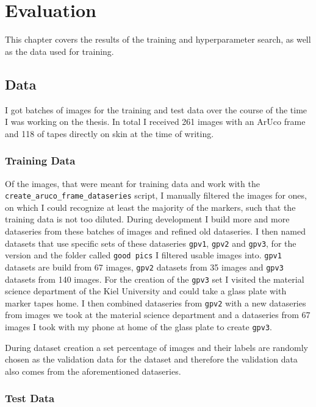 \documentclass[10pt]{book}
\begin{document}
\chapter{Evaluation}
\label{chap:eval}

This chapter covers the results of the training and hyperparameter search, as well as the data used for training.

\section{Data}

I got batches of images for the training and test data over the course of the time I was working on the thesis. In total I received 261 images with an \ac{ArUco} frame and 118 of tapes directly on skin at the time of writing. 

\subsection{Training Data}

Of the images, that were meant for training data and work with the \texttt{create\_aruco\_frame\_dataseries} script, I manually filtered the images for ones, on which I could recognize at least the majority of the markers, such that the training data is not too diluted. During development I build more and more dataseries from these batches of images and refined old dataseries. I then named datasets that use specific sets of these dataseries \texttt{gpv1}, \texttt{gpv2} and \texttt{gpv3}, for the version and the folder called \texttt{good pics} I filtered usable images into. \texttt{gpv1} datasets are build from 67 images, \texttt{gpv2} datasets from 35 images and \texttt{gpv3} datasets from 140 images. For the creation of the \texttt{gpv3} set I visited the material science department of the Kiel University and could take a glass plate with marker tapes home. I then combined dataseries from \texttt{gpv2} with a new dataseries from images we took at the material science department and a dataseries from 67 images I took with my phone at home of the glass plate to create \texttt{gpv3}.

During dataset creation a set percentage of images and their labels are randomly chosen as the validation data for the dataset and therefore the validation data also comes from the aforementioned dataseries.

\subsection{Test Data}
\end{document}
